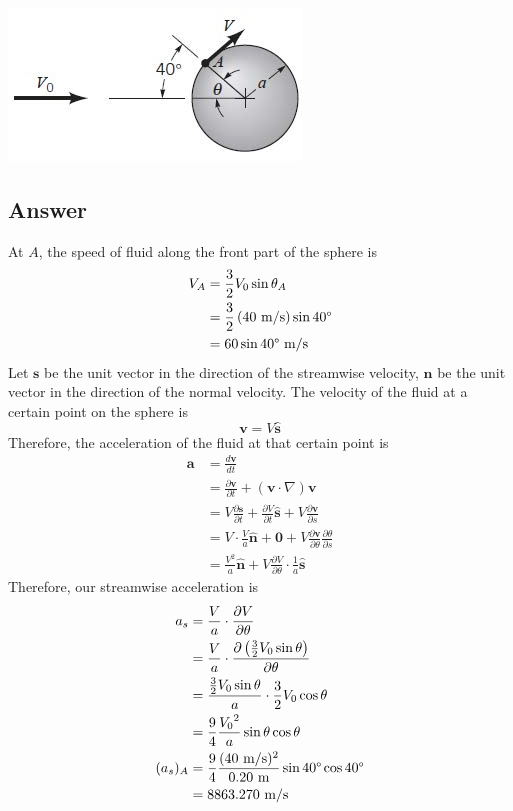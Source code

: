\documentclass{article}
\begin{document}
\begin{center}
    \includegraphics{Problem4.jpg}
\end{center}

\subsection*{Answer}
At $A$, the speed of fluid along the front part of the sphere is
\begin{align*}
    V_A &= \frac{3}{2} V_0 \sin{\theta_A} \\
    &= \frac{3}{2} \left(40\ \textrm{m}/\textrm{s}\right) \sin{40\degree} \\
    &= 60\sin{40\degree}\ \textrm{m}/\textrm{s}
\end{align*}
Let $\mathbf{s}$ be the unit vector in the direction of the streamwise velocity, $\mathbf{n}$ be the unit vector in the direction of the normal velocity. The velocity of the fluid at a certain point on the sphere is
\begin{equation}
    \mathbf{v} = V \mathbf{\hat{s}}
\end{equation}
Therefore, the acceleration of the fluid at that certain point is
\begin{align*}
    \mathbf{a} &= \frac{d\mathbf{v}}{dt} \\
    &= \frac{\partial \mathbf{v}}{\partial t} + \left(\mathbf{v} \cdot \nabla\right)\mathbf{v}\\
    &= V \frac{\partial \mathbf{\hat{s}}}{\partial t} + \frac{\partial V}{\partial t}\mathbf{\hat{s}} + V \frac{\partial \mathbf{v}}{\partial s} \\
    &= V \cdot \frac{V}{a} \mathbf{\hat{n}} + \mathbf{0} + V \frac{\partial \mathbf{v}}{\partial \theta} \frac{\partial \theta}{\partial s} \\
    &= \frac{V^2}{a} \mathbf{\hat{n}} + V \frac{\partial V}{\partial \theta} \cdot \frac{1}{a} \mathbf{{\hat{s}}}
\end{align*}
Therefore, our streamwise acceleration is
\begin{align*}
    a_s &= \frac{V}{a} \cdot \frac{\partial V}{\partial \theta} \\
    &= \frac{V}{a} \cdot \frac{\partial \left(\frac{3}{2}V_0 \sin{\theta}\right)}{\partial \theta} \\
    &= \frac{\frac{3}{2} V_0 \sin{\theta}}{a} \cdot \frac{3}{2} V_0 \cos{\theta} \\
    &= \frac{9}{4} \frac{{V_0}^2}{a} \sin{\theta} \cos{\theta} \\
    (a_s)_A &= \frac{9}{4} \frac{({40\ \textrm{m/s}})^2}{0.20\ \textrm{m}} \sin{40\degree} \cos{40\degree} \\
    &= 8863.270\ \textrm{m/s}
\end{align*}
\end{document}

